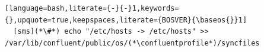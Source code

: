\begin{lstlisting}[language=bash,literate={-}{-}1,keywords={},upquote=true,keepspaces,literate={BOSVER}{\baseos{}}1]
  [sms](*\#*) echo "/etc/hosts -> /etc/hosts" >> /var/lib/confluent/public/os/(*\confluentprofile*)/syncfiles

\end{lstlisting}



